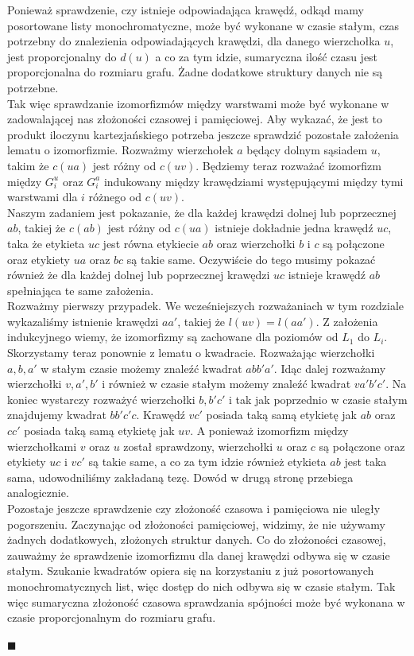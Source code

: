 \documentclass[12pt,a4paper,titlepage]{article}
\newcommand\tab[1][1cm]{\hspace*{#1}}
\begin{document}
Ponieważ sprawdzenie, czy istnieje odpowiadająca krawędź, odkąd mamy posortowane listy monochromatyczne, może być wykonane w czasie stałym, czas potrzebny do znalezienia odpowiadających krawędzi, dla danego wierzchołka $u$, jest proporcjonalny do $d(u)$ a co za tym idzie, sumaryczna ilość czasu jest proporcjonalna do rozmiaru grafu. Żadne dodatkowe struktury danych nie są potrzebne. \\
\tab[0.6cm]Tak więc sprawdzanie izomorfizmów między warstwami może być wykonane w zadowalającej nas złożoności czasowej i pamięciowej. Aby wykazać, że jest to produkt iloczynu kartezjańskiego potrzeba jeszcze sprawdzić pozostałe założenia lematu o izomorfizmie. Rozważmy wierzchołek $a$ będący dolnym sąsiadem $u$, takim że $c(ua)$ jest różny od $c(uv)$. Będziemy teraz rozważać izomorfizm między $G^u_i$ oraz $G^a_i$ indukowany między krawędziami występującymi między tymi warstwami dla $i$ różnego od $c(uv)$.\\
\tab[0.6cm]Naszym zadaniem jest pokazanie, że dla każdej krawędzi dolnej lub poprzecznej $ab$, takiej że $c(ab)$ jest różny od $c(ua)$ istnieje dokładnie jedna krawędź $uc$, taka że etykieta $uc$ jest równa etykiecie $ab$ oraz wierzchołki $b$ i $c$ są połączone oraz etykiety $ua$ oraz $bc$ są takie same. Oczywiście do tego musimy pokazać również że dla każdej dolnej lub poprzecznej krawędzi $uc$ istnieje krawędź $ab$ spełniająca te same założenia.\\
\tab[0.6cm]Rozważmy pierwszy przypadek. We wcześniejszych rozważaniach w tym rozdziale wykazaliśmy istnienie krawędzi $aa'$, takiej że $l(uv)=l(aa')$. Z założenia indukcyjnego wiemy, że izomorfizmy są zachowane dla poziomów od $L_1$ do $L_i$. Skorzystamy teraz ponownie z lematu o kwadracie. Rozważając wierzchołki $a,b,a'$ w stałym czasie możemy znaleźć kwadrat $abb'a'$. Idąc dalej rozważamy wierzchołki $v,a',b'$ i również w czasie stałym możemy znaleźć kwadrat $va'b'c'$. Na koniec wystarczy rozważyć wierzchołki $b,b'c'$ i tak jak poprzednio w czasie stałym znajdujemy kwadrat $bb'c'c$. Krawędź $vc'$ posiada taką samą etykietę jak $ab$ oraz $cc'$ posiada taką samą etykietę jak $uv$. A ponieważ izomorfizm między wierzchołkami $v$ oraz $u$ został sprawdzony, wierzchołki $u$ oraz $c$ są połączone oraz etykiety $uc$ i $vc'$ są takie same, a co za tym idzie również etykieta $ab$ jest taka sama, udowodniliśmy zakładaną tezę. Dowód w drugą stronę przebiega analogicznie.\\
\tab[0.6cm]Pozostaje jeszcze sprawdzenie czy złożoność czasowa i pamięciowa nie uległy pogorszeniu. Zaczynając od złożoności pamięciowej, widzimy, że nie używamy żadnych dodatkowych, złożonych struktur danych. Co do złożoności czasowej, zauważmy że sprawdzenie izomorfizmu dla danej krawędzi odbywa się w czasie stałym. Szukanie kwadratów opiera się na korzystaniu z już posortowanych monochromatycznych list, więc dostęp do nich odbywa się w czasie stałym. Tak więc sumaryczna złożoność czasowa sprawdzania spójności może być wykonana w czasie proporcjonalnym do rozmiaru grafu.
\\
\begin{flushright}
$\blacksquare$
\end{flushright}
\newpage
\end{document}
